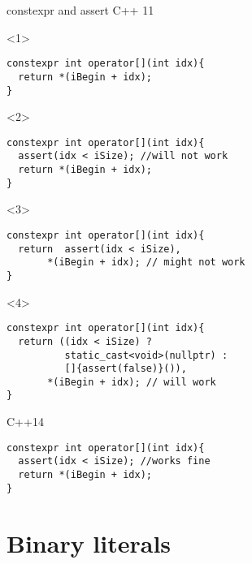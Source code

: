 \documentclass[10pt]{beamer}
\begin{document}
\begin{frame}[fragile]{constexpr and assert}
	\centering C++ 11

	\begin{onlyenv}
	\begin{verbatim}
constexpr int operator[](int idx){
  return *(iBegin + idx);
}
	\end{verbatim}
	\end{onlyenv}

	\begin{onlyenv}
	\begin{verbatim}
constexpr int operator[](int idx){
  assert(idx < iSize); //will not work
  return *(iBegin + idx);
}
	\end{verbatim}
	\end{onlyenv}

	\begin{onlyenv}
	\begin{verbatim}
constexpr int operator[](int idx){
  return  assert(idx < iSize),
       *(iBegin + idx); // might not work
}
	\end{verbatim}
	\end{onlyenv}

	\begin{onlyenv}
	\begin{verbatim}
constexpr int operator[](int idx){
  return ((idx < iSize) ? 
  	      static_cast<void>(nullptr) : 
  	      []{assert(false)}()),
       *(iBegin + idx); // will work
}
	\end{verbatim}
	\end{onlyenv}

\end{frame}

\begin{frame}[fragile]{C++14}
	\begin{verbatim}
constexpr int operator[](int idx){
  assert(idx < iSize); //works fine
  return *(iBegin + idx);
}
\end{verbatim}
\end{frame}

\section{Binary literals}
\end{document}
